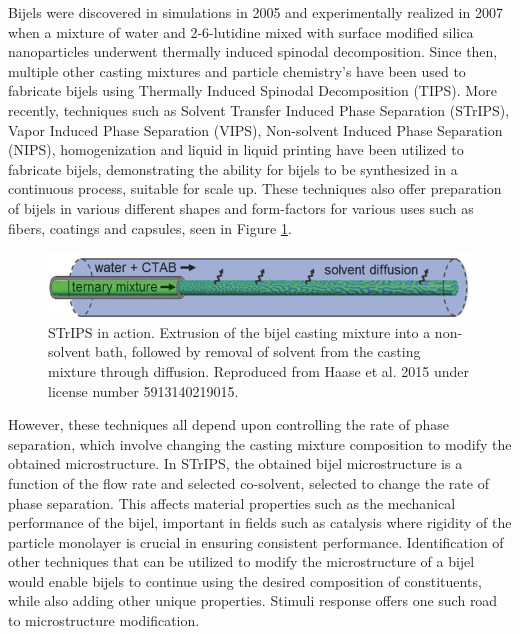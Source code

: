 Bijels were discovered in simulations in 2005 and experimentally realized in 2007 when a mixture of water and 2-6-lutidine mixed with 
surface modified silica nanoparticles underwent thermally induced spinodal decomposition. \cite{stratford_colloidal_2005, herzig_bicontinuous_2007}
Since then, multiple other casting mixtures and particle chemistry's have been used to fabricate bijels using Thermally Induced Spinodal 
Decomposition (TIPS). \cite{lee_bicontinuous_2010, bai_dynamics_2015} More recently, techniques such as Solvent Transfer Induced Phase 
Separation (STrIPS), Vapor Induced Phase Separation (VIPS), Non-solvent Induced Phase Separation (NIPS), homogenization and liquid in 
liquid printing have been utilized to fabricate bijels, demonstrating the ability for bijels to be synthesized in a continuous process, 
suitable for scale up. \cite{haase_continuous_2015, wang_scalable_2020, cai_bijels_2017, yabuno_preparation_2020, wang_bicontinuous_2023, 
amirfattahi_fabrication_2024} These techniques also offer preparation of bijels in various different shapes and form-factors for various 
uses such as fibers, coatings and capsules, seen in Figure \ref{fig:strips}. \cite{haase_continuous_2015, boakye-ansah_controlling_2020, 
kharal_hightensile_2020, wang_bicontinuous_2023}
\begin{figure}[h]
    \centering
    \includegraphics[scale = 2]{figures/literature_review/STRIPPS.jpg}
    \caption{STrIPS in action. Extrusion of the bijel casting mixture into a non-solvent bath, followed by removal of solvent from 
    the casting mixture through diffusion. Reproduced from Haase et al. 2015 under license number 5913140219015. \cite{haase_continuous_2015}}
    \label{fig:strips}
\end{figure}

However, these techniques all depend upon controlling the rate of phase separation, which involve changing the casting mixture composition to 
modify the obtained microstructure. In STrIPS, the obtained bijel microstructure is a function of the flow rate and selected co-solvent, 
selected to change the rate of phase separation. \cite{haase_continuous_2015} This affects material properties such as the mechanical 
performance of the bijel, important in fields such as catalysis where rigidity of the particle monolayer is crucial in ensuring consistent 
performance. \cite{reeves_particle-size_2015, haase_situ_2016, boakye-ansah_controlling_2020} Identification of other techniques that can 
be utilized to modify the microstructure of a bijel would enable bijels to continue using the desired composition of constituents, while 
also adding other unique properties. Stimuli response offers one such road to microstructure modification.

